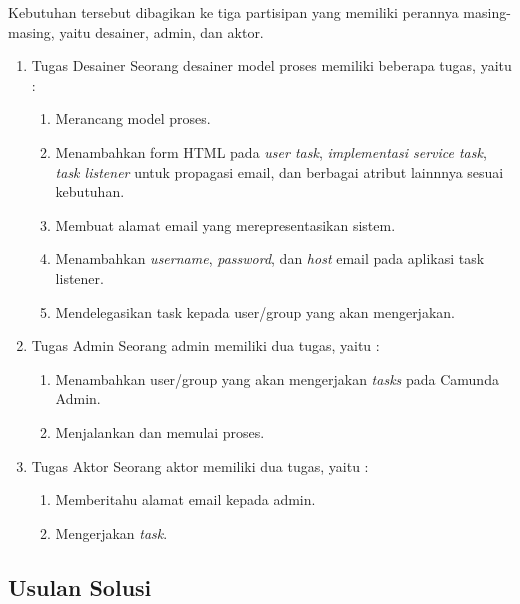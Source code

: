 Kebutuhan tersebut dibagikan ke tiga partisipan yang memiliki perannya masing-masing, yaitu desainer, admin, dan aktor.

\begin{enumerate}
\item Tugas Desainer 
Seorang desainer model proses memiliki beberapa tugas, yaitu :
\begin{enumerate}
	\item Merancang model proses.
	\item Menambahkan form HTML pada \textit{user task}, \textit{implementasi service task}, \textit{task listener} untuk propagasi email, dan berbagai atribut lainnnya sesuai kebutuhan.
	\item Membuat alamat email yang merepresentasikan sistem.
	\item Menambahkan \textit{username}, \textit{password}, dan \textit{host} email pada aplikasi task listener.
	\item Mendelegasikan task kepada user/group yang akan mengerjakan.
\end{enumerate}

\item Tugas Admin
Seorang admin memiliki dua tugas, yaitu :
\begin{enumerate}
	\item Menambahkan user/group yang akan mengerjakan \textit{tasks} pada Camunda Admin.
	\item Menjalankan dan memulai proses.
\end{enumerate}

\item Tugas Aktor
Seorang aktor memiliki dua tugas, yaitu :
\begin{enumerate}
	\item Memberitahu alamat email kepada admin.
	\item Mengerjakan \textit{task}.
\end{enumerate}

\end{enumerate}


\subsection{Usulan Solusi}
\label{sec:usulansolusi}


